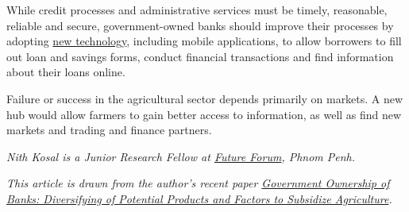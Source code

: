 \documentclass[10pt,a4paper]{letter}
\begin{document}
While credit processes and administrative services must be timely, reasonable, reliable and secure, government-owned banks should improve their processes by adopting \href{https://www.wowso.me/blog/technology-in-banking}{new technology}, including mobile applications, to allow borrowers to fill out loan and savings forms, conduct financial transactions and find information about their loans online.

Failure or success in the agricultural sector depends primarily on markets. A new hub would allow farmers to gain better access to information, as well as find new markets and trading and finance partners.

\textit{Nith Kosal is a Junior Research Fellow at \href{https://www.futureforum.asia/}{Future Forum}, Phnom Penh.}

\textit{This article is drawn from the author's recent paper \href{https://nithkosal.github.io/research/papers/WP0002.pdf}{Government Ownership of Banks: Diversifying of Potential Products and Factors to Subsidize Agriculture}.}
\end{document}
